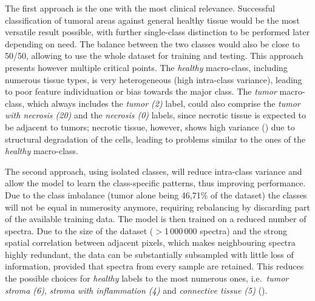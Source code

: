 The first approach is the one with the most clinical relevance. Successful classification of tumoral areas against general healthy tissue would be the most versatile result possible, with further single-class distinction to be performed later depending on need. The balance between the two classes would also be close to 50/50, allowing to use the whole dataset for training and testing. This approach presents however multiple critical points.
The \textit{healthy} macro-class, including numerous tissue types, is very heterogeneous (high intra-class variance), leading to poor feature individuation or bias towards the major class.
The \textit{tumor} macro-class, which always includes the \textit{tumor (2)} label, could also comprise the \textit{tumor with necrosis (20)} and the \textit{necrosis (0)} labels, since necrotic tissue is expected to be adjacent to tumors; necrotic tissue, however, shows high variance () due to structural degradation of the cells, leading to problems similar to the ones of the \textit{healthy} macro-class.


The second approach, using isolated classes, will reduce intra-class variance and allow the model to learn the class-specific patterns, thus improving performance.
Due to the class imbalance (tumor alone being 46,71\% of the dataset) the classes will not be equal in numerosity anymore, requiring rebalancing by discarding part of the available training data. The model is then trained on a reduced number of spectra. Due to the size of the dataset ($>$1\,000\,000 spectra) and the strong spatial correlation between adjacent pixels, which makes neighbouring spectra highly redundant, the data can be substantially subsampled with little loss of information, provided that spectra from every sample are retained. This reduces the possible choices for \textit{healthy} labels to the most numerous ones, i.e.\ \textit{tumor stroma (6)}, \textit{stroma with inflammation (4)} and \textit{connective tissue (5)} ().

